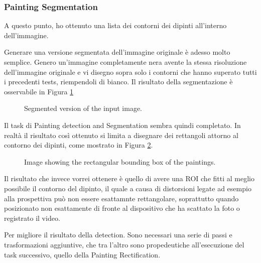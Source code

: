 \documentclass[10pt,twocolumn,letterpaper]{article}
\begin{document}
\subsubsection{Painting Segmentation}

A questo punto, ho ottenuto una lista dei contorni dei dipinti all'interno dell'immagine.

Generare una versione segmentata dell'immagine originale è adesso molto semplice. Genero un'immagine completamente nera avente la stessa risoluzione dell'immagine originale e vi disegno sopra solo i contorni che hanno superato tutti i precedenti tests, riempendoli di bianco. Il risultato della segmentazione è osservabile in Figura \ref{fig:imageSegmented}

\begin{figure}[t]
   \begin{center}
   \fbox{\rule{0pt}{2in} \rule{0.9\linewidth}{0pt}}
   \end{center}
      \caption{Segmented version of the input image.}
   \label{fig:imageSegmented}
\end{figure}

Il task di Painting detection and Segmentation sembra quindi completato. In realtà il risultato così ottenuto si limita a disegnare dei rettangoli attorno al contorno dei dipinti, come mostrato in Figura \ref{fig:imageRectROI}.

\begin{figure}[t]
   \begin{center}
   \fbox{\rule{0pt}{2in} \rule{0.9\linewidth}{0pt}}
   \end{center}
      \caption{Image showing the rectangular bounding box of the paintings.}
   \label{fig:imageRectROI}
\end{figure}

Il risultato che invece vorrei ottenere è quello di avere una ROI che fitti al meglio possibile il contorno del dipinto, il quale a causa di distorsioni legate ad esempio alla prospettiva può non essere esattamnte rettangolare, soprattutto quando posizionato non esattamente di fronte al dispositivo che ha scattato la foto o registrato il video.

Per migliore il risultato della detection. Sono necessari una serie di passi e trasformazioni aggiuntive, che tra l'altro sono propedeutiche all'esecuzione del task successivo, quello della Painting Rectification.
\end{document}
